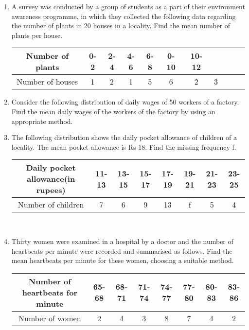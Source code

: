 \renewcommand{\theequation}{\theenumi}
\begin{enumerate}[label=\arabic*.,ref=\thesubsection.\theenumi]
\item A survey was conducted by a group of students as a part of their environment awareness
programme, in which they collected the following data regarding the number of plants in
20 houses in a locality. Find the mean number of plants per house.\\
\begin{tabular}{|c|c|c|c|c|c|c||c|c|c|c|}
\hline
Number of plants &0-2&2-4&4-6&6-8&0-10&10-12\\
\hline
Number of houses&1&2&1&5&6&2&3\\
\hline
\end{tabular}
\item Consider the following distribution of daily wages of 50 workers of a factory.
Find the mean daily wages of the workers of the factory by using an appropriate method.
\item The following distribution shows the daily pocket allowance of children of a locality.
The mean pocket allowance is Rs 18. Find the missing frequency f.
\begin{tabular}{|c|c|c|c|c|c|c|c|}
\hline
Daily pocket allowance(in rupees) &11-13&13-15&15-17&17-19&19-21&21-23&23-25\\
\hline
Number of children&7&6&9&13&f&5&4\\
\hline
\end{tabular}\\
\item Thirty women were examined in a hospital by a doctor and the number of heartbeats per
minute were recorded and summarised as follows. Find the mean heartbeats per minute
for these women, choosing a suitable method.
\begin{tabular}{|c|c|c|c|c|c|c|c|}
\hline
Number of heartbeats for minute &65-68&68-71&71-74&74-77&77-80&80-83&83-86\\
\hline
Number of women&2&4&3&8&7&4&2\\
\hline
\end{tabular}\\

\end{enumerate}
